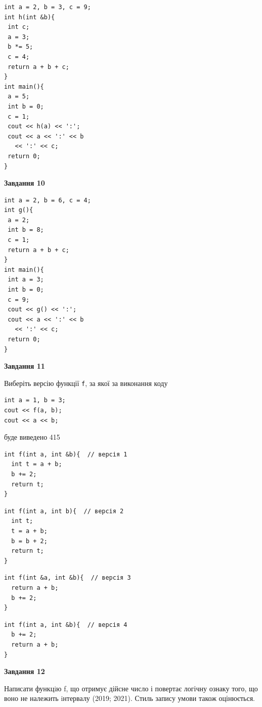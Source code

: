 \documentclass[12pt, ukrainian]{article}
\def\code#1{\Verb!#1!}
\begin{document}
{\begin {large}
\begin{minipage}[t]{7.0cm}
\begin{verbatim}
int a = 2, b = 3, c = 9;
int h(int &b){
 int c;
 a = 3;
 b *= 5;
 c = 4;
 return a + b + c;
}
int main(){
 a = 5;
 int b = 0;
 c = 1;
 cout << h(a) << ':';
 cout << a << ':' << b 
   << ':' << c;
 return 0;
}
\end{verbatim}



\begin{center}
\textbf{Завдання 10}
\end{center}
\vspace{-8mm}

\begin{verbatim}
int a = 2, b = 6, c = 4;
int g(){
 a = 2;
 int b = 8;
 c = 1;
 return a + b + c;
}
int main(){
 int a = 3;
 int b = 0;
 c = 9;
 cout << g() << ':';
 cout << a << ':' << b 
   << ':' << c;
 return 0;
}
\end{verbatim}

\end{minipage}
\vline \hspace{1mm}
\begin{minipage}[t]{11.0cm}

\begin{center}
\textbf{Завдання 11}
\end{center}
Виберіть версію функції \code{f}, за якої за виконання коду
\begin{verbatim}
int a = 1, b = 3;
cout << f(a, b);
cout << a << b;
\end{verbatim}

буде виведено 415

\begin{verbatim}
int f(int a, int &b){  // версія 1
  int t = a + b;
  b += 2;
  return t;
}
\end{verbatim}

\vspace{-8mm}\begin{verbatim}
int f(int a, int b){  // версія 2
  int t;
  t = a + b;
  b = b + 2;
  return t;
}
\end{verbatim}

\vspace{-8mm}\begin{verbatim}
int f(int &a, int &b){  // версія 3
  return a + b;
  b += 2;
}
\end{verbatim}

\vspace{-8mm}\begin{verbatim}
int f(int a, int &b){  // версія 4
  b += 2;
  return a + b;
}
\end{verbatim}



\begin{center}
\textbf{Завдання 12}
\end{center}

Написати функцiю f, що отримує дійсне число і повертає логічну ознаку того, що воно не належить iнтервалу (2019; 2021). Стиль запису умови також оцінюється.\par

\end{minipage}

\end {large}}
\end{document}
